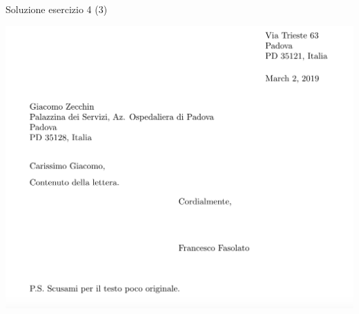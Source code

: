 \begin{frame}[fragile]{Soluzione esercizio 4 (3)}

\includegraphics[scale=0.33]{res/images/letterdisplay}

\end{frame}